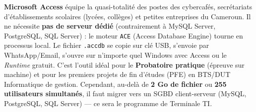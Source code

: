 \documentclass[11pt]{article}
\begin{document}
\begin{savaistu}
\textbf{Microsoft Access} équipe la quasi-totalité des postes des cybercafés, secrétariats d'établissements scolaires (lycées, collèges) et petites entreprises du Cameroun. Il ne nécessite \textbf{pas de serveur dédié} (contrairement à MySQL Server, PostgreSQL, SQL Server) : le moteur \texttt{ACE} (Access Database Engine) tourne en processus local. Le fichier \texttt{.accdb} se copie sur clé USB, s'envoie par WhatsApp/Email, s'ouvre sur n'importe quel Windows avec Access ou le \emph{Runtime} gratuit. C'est l'outil idéal pour le \textbf{Probatoire pratique} (épreuve sur machine) et pour les premiers projets de fin d'études (PFE) en BTS/DUT Informatique de gestion. Cependant, au-delà de \textbf{2 Go de fichier} ou \textbf{255 utilisateurs simultanés}, il faut migrer vers un SGBD client-serveur (MySQL, PostgreSQL, SQL Server) — ce sera le programme de Terminale TI.
\end{savaistu}
\end{document}
